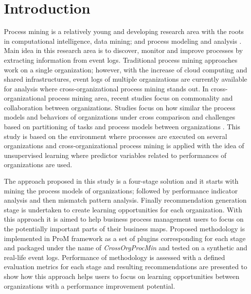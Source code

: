 \section{Introduction}
\label{sec:introduction}

Process mining is a relatively young and developing research area with the roots in computational intelligence, data mining; and process modeling and analysis \cite{van2012process}. Main idea in this research area is to discover, monitor and improve processes by extracting information from event logs. Traditional process mining approaches work on a single organization; however, with the increase of cloud computing and shared infrastructures, event logs of multiple organizations are currently available for analysis where cross-organizational process mining stands out. In cross-organizational process mining area, recent studies focus on commonality and collaboration between organizations. Studies focus on how similar the process models and behaviors of organizations under cross comparison \cite{buijs2012towards} and challenges based on partitioning of tasks and process models between organizations \cite{van2011intra}. This study is based on the environment where processes are executed on several organizations and cross-organizational process mining is applied with the idea of unsupervised learning where predictor variables related to performances of organizations are used.

The approach proposed in this study is a four-stage solution and it starts with mining the process models of organizations; followed by performance indicator analysis and then mismatch pattern analysis. Finally recommendation generation stage is undertaken to create learning opportunities for each organization. With this approach it is aimed to help business process management users to focus on the potentially important parts of their business maps. Proposed methodology is implemented in ProM framework \cite{verbeek2010prom} as a set of plugins corresponding for each stage and packaged under the name of \textit{CrossOrgProcMin} and tested on a synthetic and real-life event logs. Performance of methodology is assessed with a defined evaluation metrics for each stage and resulting recommendations are presented to show how this approach helps users to focus on learning opportunities between organizations with a performance improvement potential.

